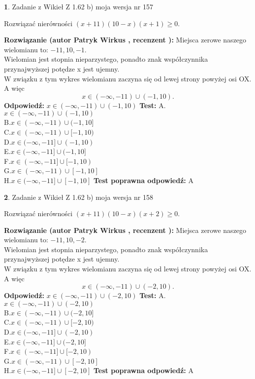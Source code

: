\documentclass[12pt, a4paper]{article}
\theoremstyle{definition} %
\newtheorem{zad}{}
\newcommand{\zadStart}[1]{\begin{zad}#1\newline}
\newcommand{\zadStop}{\end{zad}}
\newcommand{\rozwStart}[2]{\noindent \textbf{Rozwiązanie (autor #1 , recenzent #2): }\newline}
\newcommand{\rozwStop}{\newline}
\newcommand{\odpStart}{\noindent \textbf{Odpowiedź:}\newline}
\newcommand{\odpStop}{\newline}
\newcommand{\testStart}{\noindent \textbf{Test:}\newline}
\newcommand{\testStop}{\newline}
\newcommand{\kluczStart}{\noindent \textbf{Test poprawna odpowiedź:}\newline}
\newcommand{\kluczStop}{\newline}
\begin{document}
\zadStart{Zadanie z Wikieł Z 1.62 b) moja wersja nr 157}

Rozwiązać nierówności $(x+11)(10-x)(x+1)\ge0$.
\zadStop
\rozwStart{Patryk Wirkus}{}
Miejsca zerowe naszego wielomianu to: $-11, 10, -1$.\\
Wielomian jest stopnia nieparzystego, ponadto znak współczynnika przy\linebreak najwyższej potędze x jest ujemny.\\ W związku z tym wykres wielomianu zaczyna się od lewej strony powyżej osi OX. A więc $$x \in (-\infty,-11) \cup (-1,10).$$
\rozwStop
\odpStart
$x \in (-\infty,-11) \cup (-1,10)$
\odpStop
\testStart
A.$x \in (-\infty,-11) \cup (-1,10)$\\
B.$x \in (-\infty,-11) \cup (-1,10]$\\
C.$x \in (-\infty,-11) \cup [-1,10)$\\
D.$x \in (-\infty,-11] \cup (-1,10)$\\
E.$x \in (-\infty,-11] \cup (-1,10]$\\
F.$x \in (-\infty,-11] \cup [-1,10)$\\
G.$x \in (-\infty,-11) \cup [-1,10]$\\
H.$x \in (-\infty,-11] \cup [-1,10]$
\testStop
\kluczStart
A
\kluczStop



\zadStart{Zadanie z Wikieł Z 1.62 b) moja wersja nr 158}

Rozwiązać nierówności $(x+11)(10-x)(x+2)\ge0$.
\zadStop
\rozwStart{Patryk Wirkus}{}
Miejsca zerowe naszego wielomianu to: $-11, 10, -2$.\\
Wielomian jest stopnia nieparzystego, ponadto znak współczynnika przy\linebreak najwyższej potędze x jest ujemny.\\ W związku z tym wykres wielomianu zaczyna się od lewej strony powyżej osi OX. A więc $$x \in (-\infty,-11) \cup (-2,10).$$
\rozwStop
\odpStart
$x \in (-\infty,-11) \cup (-2,10)$
\odpStop
\testStart
A.$x \in (-\infty,-11) \cup (-2,10)$\\
B.$x \in (-\infty,-11) \cup (-2,10]$\\
C.$x \in (-\infty,-11) \cup [-2,10)$\\
D.$x \in (-\infty,-11] \cup (-2,10)$\\
E.$x \in (-\infty,-11] \cup (-2,10]$\\
F.$x \in (-\infty,-11] \cup [-2,10)$\\
G.$x \in (-\infty,-11) \cup [-2,10]$\\
H.$x \in (-\infty,-11] \cup [-2,10]$
\testStop
\kluczStart
A
\kluczStop
\end{document}
